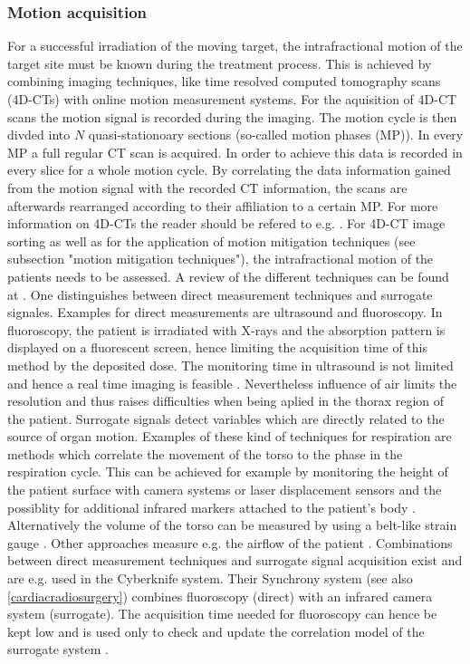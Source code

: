 \documentclass[type=dr, dr=rernat, accentcolor=tud7b,colorbacktitle, bigchapter, openright, twoside, 12pt ]{tudthesis}
\begin{document}
\subsubsection{Motion acquisition}
\label{Motionacq}
For a successful irradiation of the moving target, the intrafractional motion of the target site must be known during the treatment process. 
This is achieved by combining imaging techniques, like time resolved computed tomography scans (4D-CTs) with online motion measurement 
systems.\newline
\newline
For the aquisition of 4D-CT scans the motion signal is recorded during the imaging. The motion cycle is then divded into $N$ quasi-stationoary 
sections (so-called motion phases (MP)). In every MP a full regular CT scan is acquired. In order to achieve this data is recorded in every 
slice for a whole motion cycle. By correlating the data information gained from the motion signal with the recorded CT information, the 
scans are afterwards rearranged according to their affiliation to a certain MP. For more information on 4D-CTs the reader should be 
refered to e.g. \cite{Rie05}.\newline
\newline
For 4D-CT image sorting as well as for the application of motion mitigation techniques (see subsection "motion mitigation techniques"), 
the intrafractional motion of the patients needs to be assessed. A review of the different techniques can be found at \cite{Eva08}. 
One distinguishes between direct measurement techniques and surrogate signales. Examples for direct measurements are ultrasound and 
fluoroscopy. In fluoroscopy, the patient is irradiated with X-rays and 
the absorption pattern is displayed on a fluorescent screen, hence limiting the acquisition time of this method by the deposited dose. 
The monitoring time in ultrasound is not limited and hence a real time imaging is feasible \cite{Pra12}. Nevertheless 
influence of air limits the resolution and thus raises difficulties when being aplied in the thorax region of the patient. 
Surrogate signals detect variables which are directly related to the source of organ motion. Examples of these kind of techniques for 
respiration are methods which correlate the movement of the torso to the phase in the respiration cycle. This can be achieved for example 
by monitoring the height of the patient surface with camera systems or laser displacement sensors and the possiblity for additional 
infrared markers attached to the patient's body \cite{Tad98} \cite{Ber05} \cite{Sch04}. Alternatively the volume of the torso can be 
measured by using a belt-like strain gauge \cite{Li06}. Other approaches measure e.g. the airflow of the patient \cite{Kub96} \cite{Han99}.\newline
\newline
Combinations between direct measurement techniques and surrogate signal acquisition exist and are e.g. used in the 
Cyberknife system. Their Synchrony system (see also \ref{cardiacradiosurgery}) combines fluoroscopy (direct) with an infrared camera 
system (surrogate). The acquisition time needed for fluoroscopy can hence be kept low and is used only to check and update the correlation 
model of the surrogate system \cite{Sha10} \cite{Lue12}.
\end{document}
